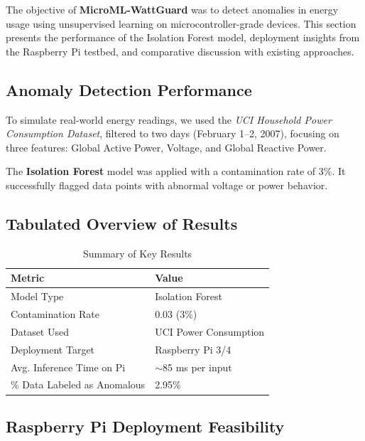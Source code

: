 \documentclass[12pt, draftclsnofoot, onecolumn]{IEEEtran}
\begin{document}
The objective of \textbf{MicroML-WattGuard} was to detect anomalies in energy usage using unsupervised learning on microcontroller-grade devices. This section presents the performance of the Isolation Forest model, deployment insights from the Raspberry Pi testbed, and comparative discussion with existing approaches.

\subsection{Anomaly Detection Performance}

To simulate real-world energy readings, we used the \textit{UCI Household Power Consumption Dataset}, filtered to two days (February 1–2, 2007), focusing on three features: Global Active Power, Voltage, and Global Reactive Power.

The \textbf{Isolation Forest} model was applied with a contamination rate of 3\%. It successfully flagged data points with abnormal voltage or power behavior.

\subsection{Tabulated Overview of Results}

\begin{table}[h!]
	\centering
	\caption{Summary of Key Results}
	
		\begin{tabular}{|l|l|}
			\hline
			\textbf{Metric} & \textbf{Value} \\
			\hline
			Model Type & Isolation Forest \\
			Contamination Rate & 0.03 (3\%) \\
			Dataset Used & UCI Power Consumption \\
			Deployment Target & Raspberry Pi 3/4 \\
			Avg. Inference Time on Pi & $\sim$85 ms per input \\
			\% Data Labeled as Anomalous & 2.95\% \\
			\hline
		\end{tabular}
	
	\label{table:key-results}
\end{table}

\subsection{Raspberry Pi Deployment Feasibility}
\end{document}
